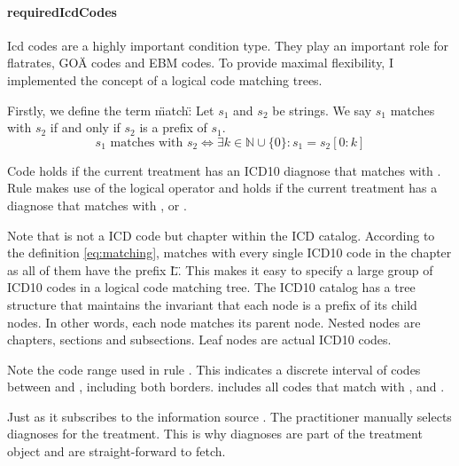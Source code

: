 \paragraph{requiredIcdCodes}

Icd codes are a highly important condition type.
They play an important role for flatrates, GOÄ codes and EBM codes.
To provide maximal flexibility, I implemented the concept of a logical code matching trees.



Firstly, we define the term \"match\":
Let \( s_1 \) and \( s_2 \) be strings.
We say \( s_1 \) matches with \( s_2 \) if and only if \( s_2 \) is a prefix of \( s_1 \).
\begin{equation}\label{eq:matching}
    s_1 \text{ matches with } s_2 \iff \exists k \in \mathbb{N} \cup \{0\} : s_1 = s_2[0:k]
\end{equation}

Code  holds if the current treatment has an ICD10 diagnose that matches with .
Rule  makes use of the logical  operator and holds if the current treatment has a diagnose that matches with ,  or .

Note that  is not a ICD code but chapter within the ICD catalog.
According to the definition \ref{eq:matching},  matches with every single ICD10 code in the  chapter as all of them have the prefix \"L\".
This makes it easy to specify a large group of ICD10 codes in a logical code matching tree.
The ICD10 catalog has a tree structure that maintains the invariant that each node is a prefix of its child nodes.
In other words, each node matches its parent node.
Nested nodes are chapters, sections and subsections.
Leaf nodes are actual ICD10 codes.

Note the code range  used in rule .
This indicates a discrete interval of codes between  and , including both borders.
 includes all codes that match with ,  and .

Just as  it subscribes to the information source .
The practitioner manually selects diagnoses for the treatment.
This is why diagnoses are part of the treatment object and are straight-forward to fetch.

